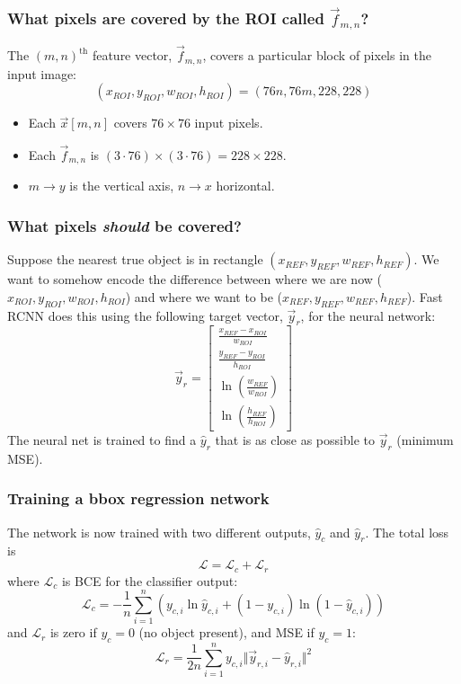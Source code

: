 \documentclass{beamer}
\begin{document}
\begin{frame}
  \frametitle{What pixels are covered by the ROI called
    $\vec{f}_{m,n}$?}

  The $(m,n)^{\textrm{th}}$ feature vector, $\vec{f}_{m,n}$, covers a
  particular block of pixels in the input image:
  \[
  (x_{ROI},y_{ROI},w_{ROI},h_{ROI}) =
  (76n, 76m, 228,228)
  \]
  \begin{itemize}
  \item Each $\vec{x}[m,n]$ covers $76\times 76$ input pixels.
  \item Each $\vec{f}_{m,n}$ is $(3\cdot 76)\times(3\cdot 76)=228\times 228$.
  \item $m\rightarrow y$ is the vertical axis, $n\rightarrow x$ horizontal.
  \end{itemize}
\end{frame}

\begin{frame}
  \frametitle{What pixels {\bf\em should} be covered?}

  Suppose the nearest true object is in rectangle
  $(x_{REF},y_{REF},w_{REF},h_{REF})$.  We want to somehow encode the
  difference between where we are now
  ($x_{ROI},y_{ROI},w_{ROI},h_{ROI}$) and where we want to be
  ($x_{REF},y_{REF},w_{REF},h_{REF}$).  Fast RCNN does this using the
  following target vector, $\vec{y}_r$, for the neural network:
  \[
  \vec{y}_r = \left[\begin{array}{c}
      \frac{x_{REF}-x_{ROI}}{w_{ROI}}\\
      \frac{y_{REF}-y_{ROI}}{h_{ROI}}\\
      \ln\left(\frac{w_{REF}}{w_{ROI}}\right)\\
      \ln\left(\frac{h_{REF}}{h_{ROI}}\right)
    \end{array}\right]
  \]
  The neural net is trained to find a $\hat{y}_r$ that is as close as
  possible to $\vec{y}_r$ (minimum MSE).
\end{frame}


\begin{frame}
  \frametitle{Training a bbox regression network}

  The network is now trained with two different outputs, $\hat{y}_c$
  and $\hat{y}_r$.  The total loss is
  \begin{displaymath}
    {\mathcal L}={\mathcal L}_c+{\mathcal L}_r
  \end{displaymath}
  where ${\mathcal L}_c$ is BCE for the classifier output:
  \begin{displaymath}
    {\mathcal L}_c = -\frac{1}{n}\sum_{i=1}^n \left(y_{c,i}\ln\hat{y}_{c,i}+(1-y_{c,i})\ln(1-\hat{y}_{c,i})
    \right)
  \end{displaymath}
  and ${\mathcal L}_r$ is zero if $y_c=0$ (no object present), and MSE
  if $y_c=1$:
  \begin{displaymath}
    {\mathcal L}_r = \frac{1}{2n}\sum_{i=1}^n y_{c,i}\Vert\vec{y}_{r,i}-\hat{y}_{r,i}\Vert^2
  \end{displaymath}
\end{frame}
    
\end{document}
